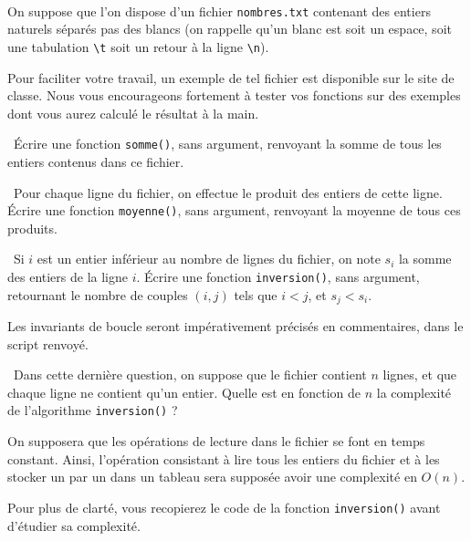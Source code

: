 \exer{[FIC-002]}
\setcounter{numques}{0}~\\

 On suppose que l'on dispose d'un fichier \texttt{nombres.txt} contenant des entiers naturels séparés pas des blancs (on 
 rappelle qu'un blanc est soit un espace, soit une tabulation \texttt{\textbackslash t} soit un retour à la ligne 
 \texttt{\textbackslash n}).

 Pour faciliter votre travail, un exemple de tel fichier est disponible sur le site de classe. Nous vous encourageons fortement à tester vos fonctions sur des exemples dont vous aurez calculé le résultat à la main.  

\question\ Écrire une fonction \texttt{somme()}, sans argument, renvoyant la somme de tous les entiers contenus dans ce fichier.


\question\ Pour chaque ligne du fichier, on effectue le produit des entiers de cette ligne. Écrire une fonction \texttt{moyenne()}, sans 
argument, renvoyant la moyenne de tous ces produits.


\question\ Si $i$ est un entier inférieur au nombre de lignes du fichier, on note $s_i$ la somme des entiers de la ligne 
$i$. Écrire une fonction \texttt{inversion()}, sans argument, retournant le nombre de couples $(i, j)$ tels que $i < 
j$, et $s_j<s_i$. 

Les invariants de boucle seront impérativement précisés en commentaires, dans le script renvoyé.

\question\ Dans cette dernière question, on suppose que le fichier contient $n$ lignes, et que chaque ligne 
ne contient qu'un entier. Quelle est en fonction de $n$ la complexité de l'algorithme \texttt{inversion()} ? 

On supposera que les opérations de lecture dans le fichier se font en temps constant. Ainsi, l'opération consistant à lire tous les 
entiers du fichier et à les stocker un par un dans un tableau sera supposée avoir une complexité en $O(n)$.

Pour plus de clarté, vous recopierez le code de la fonction \texttt{inversion()} avant d'étudier sa complexité. 
